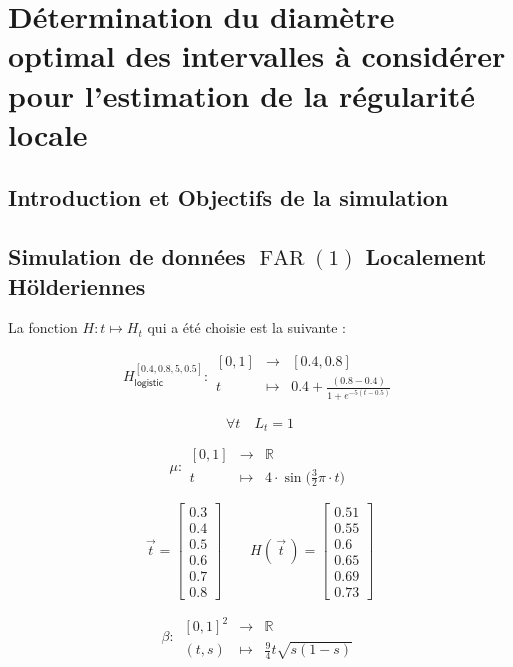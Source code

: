 \chapter{Détermination du diamètre optimal des intervalles à considérer pour l'estimation de la régularité locale }
\minitoc%

\section{Introduction et Objectifs de la simulation}

\section{Simulation de données $\operatorname{FAR}(1)$ Localement Hölderiennes}

La fonction $H : t \mapsto H_t$ qui a été choisie est la suivante :

$$
H^{[0.4, 0.8, 5, 0.5]}_{\textsf{logistic}} : \begin{array}{ccc}
    [0,1] & \longrightarrow & [0.4, 0.8]
    \\
    t & \longmapsto & 0.4 + \frac{(0.8 - 0.4)}{1 + e^{-5(t - 0.5)}}
\end{array}
$$

$$\forall t \quad L_t = 1$$

$$
\mu : \begin{array}{ccc}
    [0,1] & \longrightarrow & \mathbb R
    \\
    t & \longmapsto & 4 \cdot \sin\bigl( \frac 3 2 \pi \cdot t \bigr)
\end{array}
$$

$$
\vec t = \begin{bmatrix} 0.3 \\ 0.4 \\ 0.5 \\ 0.6 \\ 0.7 \\ 0.8 \end{bmatrix}
\quad\quad
H(\, \vec t \,) = 
\begin{bmatrix}
    0.51 \\ 0.55 \\ 0.6 \\ 0.65 \\ 0.69 \\ 0.73
\end{bmatrix}
$$

$$
\beta : \, \begin{array}{ccc}
    [0,1]^2 & \longrightarrow & \mathbb R
    \\
    (t,s) & \longmapsto & \frac 9 4 t\sqrt{ s(1-s) }
\end{array}
$$

